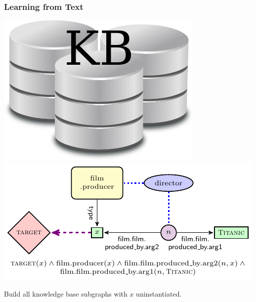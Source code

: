 \documentclass[mathserif,12pt]{beamer}
\begin{document}
\begin{frame}
\frametitle{Learning from Text}
\begin{center}

\vspace{.5cm}

\includegraphics[scale=.3]{figures/db} \includegraphics[scale=1.2]{figures/unique_example_grounded2}
\vspace{.5cm}

Build all knowledge base subgraphs with $x$ uninstantiated.
\end{center}
\end{frame}
\end{document}
